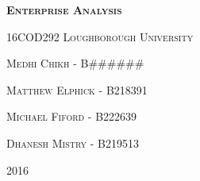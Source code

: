 \begin{titlepage}
\begin{center}
\textbf{\textsc{\Huge Enterprise Analysis}}
\par
\vspace{0.5cm}
\textsc{\huge 16COD292}
\vfill
\textsc{\Huge Loughborough University}
\vspace{1cm}
\par
\textsc{\huge Medhi Chikh - B\#\#\#\#\#\#}
\par
\vspace{0.2cm}
\textsc{\huge Matthew Elphick - B218391}
\par
\vspace{0.2cm}
\textsc{\huge Michael Fiford - B222639}
\par
\vspace{0.2cm}
\textsc{\huge Dhanesh Mistry - B219513}
\vspace{1cm}
\par
\textsc{\Huge 2016}
\end{center}
\end{titlepage}